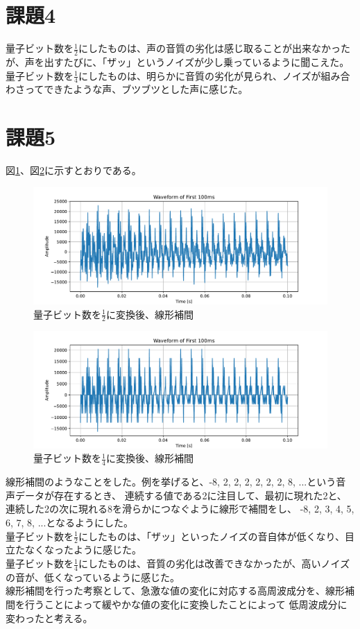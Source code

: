 \documentclass[a4j,11pt]{jarticle}
\begin{document}
    \section{課題4}
    量子ビット数を$\frac 1 2$にしたものは、声の音質の劣化は感じ取ることが出来なかったが、声を出すたびに、「ザッ」というノイズが少し乗っているように聞こえた。\\
    量子ビット数を$\frac 1 4$にしたものは、明らかに音質の劣化が見られ、ノイズが組み合わさってできたような声、ブツブツとした声に感じた。\\
    \section{課題5}
    図\ref{fig:5-1}、図\ref{fig:5-2}に示すとおりである。
    \begin{figure}[tb]
        \centering
        \includegraphics[width=0.8\hsize]{../../figure/dataplot_8bit_reconst_linear_interpolation_arayurugennzituwo.pdf}
        \caption{量子ビット数を$\frac 1 2$に変換後、線形補間}
        \label{fig:5-1}
    \end{figure}
    \begin{figure}[tb]
        \centering
        \includegraphics[width=0.8\hsize]{../../figure/dataplot_4bit_reconst_linear_interpolation_arayurugennzituwo.pdf}
        \caption{量子ビット数を$\frac 1 4$に変換後、線形補間}
        \label{fig:5-2}
    \end{figure}
    線形補間のようなことをした。例を挙げると、-8, 2, 2, 2, 2, 2, 2, 8, ...という音声データが存在するとき、
    連続する値である2に注目して、最初に現れた2と、連続した2の次に現れる8を滑らかにつなぐように線形で補間をし、
    -8, 2, 3, 4, 5, 6, 7, 8, ...となるようにした。\\
    量子ビット数を$\frac 1 2$にしたものは、「ザッ」といったノイズの音自体が低くなり、目立たなくなったように感じた。\\
    量子ビット数を$\frac 1 4$にしたものは、音質の劣化は改善できなかったが、高いノイズの音が、低くなっているように感じた。\\
    線形補間を行った考察として、急激な値の変化に対応する高周波成分を、線形補間を行うことによって緩やかな値の変化に変換したことによって
    低周波成分に変わったと考える。
    
\end{document}
